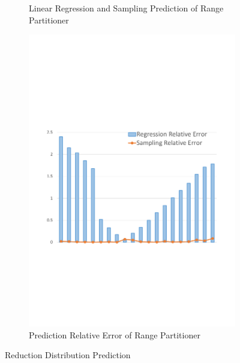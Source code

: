 \begin{figure}
\begin{subfigure}[b]{0.32\linewidth}
		\caption{Linear Regression and Sampling Prediction of Range Partitioner}
		\label{fig:range_pre_sample}
	\end{subfigure}
	\begin{subfigure}[b]{0.32\linewidth}
		\includegraphics[width=\linewidth]{fig/prediction_relative_error}
		\caption{Prediction Relative Error of Range Partitioner}
		\label{fig:prediction_relative_error}
	\end{subfigure}
	\caption{Reduction Distribution Prediction}
	\label{fig:dis}
\end{figure}
